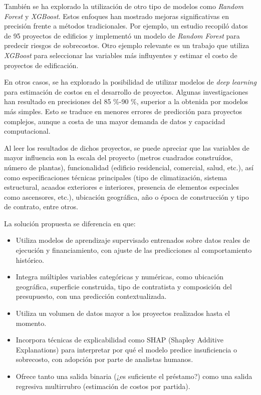\documentclass[
11pt, %
]{charter}
\begin{document}
También se ha explorado la utilización de otro tipo de modelos como \textit{Random Forest} y \textit{XGBoost}. Estos enfoques han mostrado mejoras significativas en precisión frente a métodos tradicionales. Por ejemplo, un estudio recopiló datos de 95 proyectos de edificios y implementó un modelo de \textit{Random Forest} para predecir riesgos de sobrecostos. Otro ejemplo relevante es un trabajo que utiliza \textit{XGBoost} para seleccionar las variables más influyentes y estimar el costo de proyectos de edificación.

En otros casos, se ha explorado la posibilidad de utilizar modelos de \textit{deep learning} para estimación de costos en el desarrollo de proyectos. Algunas investigaciones han resultado en precisiones del 85 \%-90 \%, superior a la obtenida por modelos más simples. Esto se traduce en menores errores de predicción para proyectos complejos, aunque a costa de una mayor demanda de datos y capacidad computacional.

Al leer los resultados de dichos proyectos, se puede apreciar que las variables de mayor influencia son la escala del proyecto (metros cuadrados construídos, número de plantas), funcionalidad (edificio residencial, comercial, salud, etc.), así como especificaciones técnicas principales (tipo de climatización, sistema estructural, acaados exteriores e interiores, presencia de elementos especiales como ascensores, etc.), ubicación geográfica, año o época de construcción y tipo de contrato, entre otros.


La solución propuesta se diferencia en que:
\begin{itemize}
    \item Utiliza modelos de aprendizaje supervisado entrenados sobre datos reales de ejecución y financiamiento, con ajuste de las predicciones al comportamiento histórico.
    \item Integra múltiples variables categóricas y numéricas, como ubicación geográfica, superficie construida, tipo de contratista y composición del presupuesto, con una predicción contextualizada.
    \item Utiliza un volumen de datos mayor a los proyectos realizados hasta el momento.
    \item Incorpora técnicas de explicabilidad como SHAP (Shapley Additive Explanations) para interpretar por qué el modelo predice insuficiencia o sobrecosto, con adopción por parte de analistas humanos.
    \item Ofrece tanto una salida binaria (¿es suficiente el préstamo?) como una salida regresiva multirrubro (estimación de costos por partida).
\end{itemize}
\end{document}
